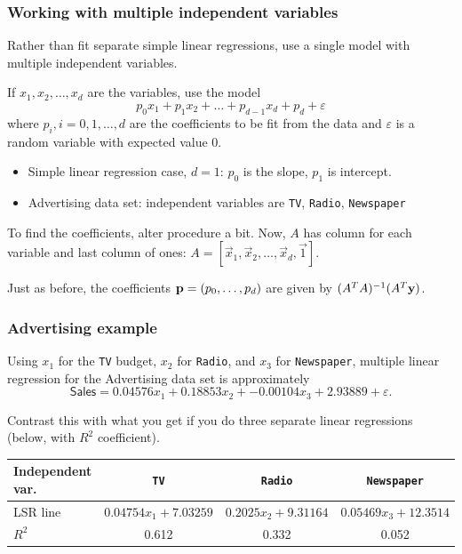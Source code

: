 \documentclass{beamer}
\theoremstyle{example}
\newcommand{\ttt}[1]{{\small\texttt{#1}}}
\begin{document}
\begin{frame}
\frametitle{Working with multiple independent variables}
    Rather than fit separate simple linear regressions, use a single model with multiple independent variables. 
\pause

    If $x_1,x_2,\ldots,x_d$ are the variables, use the model 
    \[p_0x_1 + p_1x_2 + \ldots + p_{d-1}x_d + p_d + \varepsilon\]
    where $p_i, i=0,1,\ldots,d$ are the coefficients to be fit from the data and $\varepsilon$ is a random variable with expected value 0.
    \begin{itemize}
        \item Simple linear regression case, $d=1$: $p_0$ is the slope, $p_1$ is intercept.
        \item Advertising data set: independent variables are \ttt{TV}, \ttt{Radio}, \ttt{Newspaper}
    \end{itemize}

\pause
    To find the coefficients, alter procedure a bit. Now, $A$ has column for each variable and last column of ones: $A = [\vec{x}_1, \vec{x}_2, \ldots, \vec{x}_d, \vec{1}]$.

    Just as before, the coefficients ${\bf p} = (p_0,\ldots, p_d)$ are given by $(A^TA)^{-1}(A^T{\bf y})$.

\end{frame}

\begin{frame}
\frametitle{Advertising example}
    Using $x_1$ for the \ttt{TV} budget, $x_2$ for \ttt{Radio}, and $x_3$ for \ttt{Newspaper}, multiple linear regression for the Advertising data set is approximately 
        \[\textsf{Sales} = 0.04576x_1 + 0.18853x_2 + -0.00104x_3 + 2.93889 + \varepsilon.\]
    
    Contrast this with what you get if you do three separate linear regressions (below, with $R^2$ coefficient).
    \centering
    \begin{tabular}{l c c c}
        Independent var. & \ttt{TV} & \ttt{Radio} & \ttt{Newspaper} \\ 
        \hline 
        LSR line    &  $0.04754x_1 + 7.03259$ & $0.2025x_2 + 9.31164$ & $0.05469x_3 + 12.3514$ \\
        \hline 
        $R^2$       &  0.612  &  0.332  &  0.052
    \end{tabular}

\end{frame}
\end{document}
